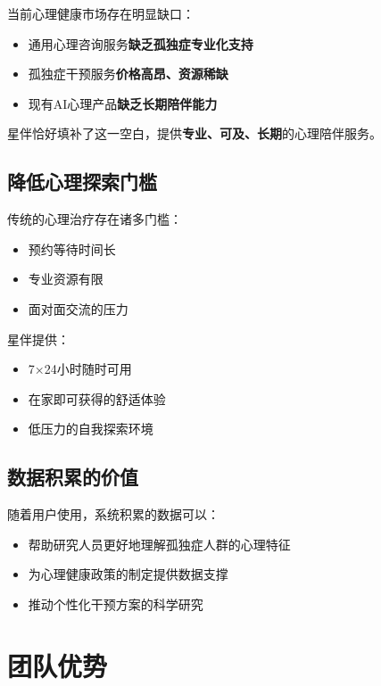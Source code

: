 \documentclass[12pt,a4paper]{article}
\begin{document}
当前心理健康市场存在明显缺口：
\begin{itemize}[leftmargin=*]
    \item 通用心理咨询服务\textbf{缺乏孤独症专业化支持}
    \item 孤独症干预服务\textbf{价格高昂、资源稀缺}
    \item 现有AI心理产品\textbf{缺乏长期陪伴能力}
\end{itemize}

星伴恰好填补了这一空白，提供\textbf{专业、可及、长期}的心理陪伴服务。

\subsection{降低心理探索门槛}

传统的心理治疗存在诸多门槛：
\begin{itemize}[leftmargin=*]
    \item 预约等待时间长
    \item 专业资源有限
    \item 面对面交流的压力
\end{itemize}

星伴提供：
\begin{itemize}[leftmargin=*]
    \item 7×24小时随时可用
    \item 在家即可获得的舒适体验
    \item 低压力的自我探索环境
\end{itemize}

\subsection{数据积累的价值}

随着用户使用，系统积累的数据可以：
\begin{itemize}[leftmargin=*]
    \item 帮助研究人员更好地理解孤独症人群的心理特征
    \item 为心理健康政策的制定提供数据支撑
    \item 推动个性化干预方案的科学研究
\end{itemize}

\section{团队优势}
\end{document}
